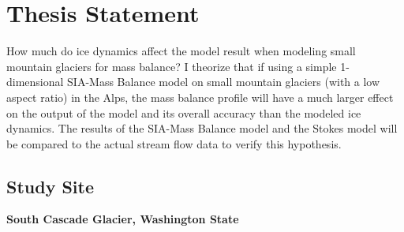 \documentclass{article}
\begin{document}
\section{Thesis Statement}
How much do ice dynamics affect the model result when modeling small mountain glaciers for mass balance? I theorize that if using a simple 
1-dimensional SIA-Mass Balance model on small mountain glaciers (with a low aspect ratio) in the Alps, the mass balance profile will have a 
much larger effect on the output of the model and its overall accuracy than the modeled ice dynamics. The results of the SIA-Mass Balance 
model and the Stokes model will be compared to the actual stream flow data to verify this hypothesis.
\subsection{Study Site}
\textbf{\large South Cascade Glacier, Washington State}
\end{document}
